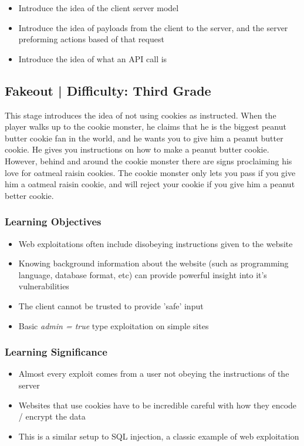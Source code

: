 \documentclass{article}
\begin{document}
\begin{itemize}
  \item Introduce the idea of the client server model
  \item Introduce the idea of payloads from the client to the server,
    and the server preforming actions based of that request
  \item Introduce the idea of what an API call is
\end{itemize}

\subsection{Fakeout | Difficulty: Third Grade}

This stage introduces the idea of not using cookies as instructed. When the player
walks up to the cookie monster, he claims that he is the biggest
peanut butter cookie fan in the world, and he wants you to give him a
peanut butter cookie. He gives you instructions on how to make a
peanut butter cookie. However, behind and around the cookie monster there are
signs proclaiming his love for oatmeal raisin cookies. The cookie
monster only lets you pass if you give him a oatmeal raisin cookie,
and will reject your cookie if you give him a peanut better cookie. 

\subsubsection{Learning Objectives}

\begin{itemize}
  \item Web exploitations often include disobeying instructions given
    to the website
  \item Knowing background information about the website (such as
    programming language, database format, etc) can provide powerful
    insight into it's vulnerabilities
  \item The client cannot be trusted to provide 'safe' input
  \item Basic \textit{admin = true} type exploitation on simple sites
\end{itemize}

\subsubsection{Learning Significance}

\begin{itemize}
  \item Almost every exploit comes from a user not obeying the
    instructions of the server
  \item Websites that use cookies have to be incredible careful with
    how they encode / encrypt the data
  \item This is a similar setup to SQL injection, a classic example of
    web exploitation
\end{itemize}
\end{document}
